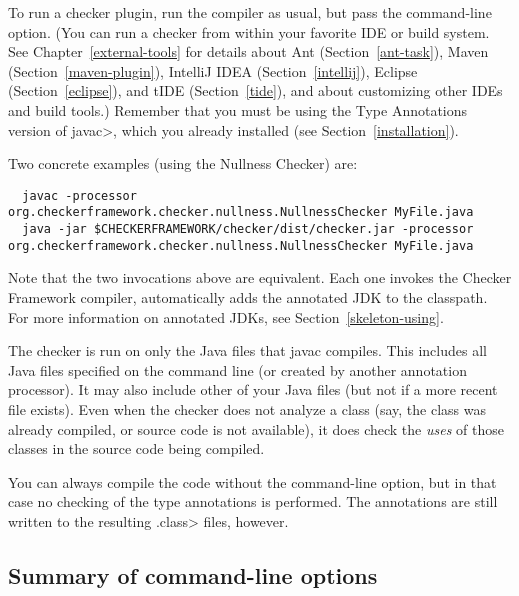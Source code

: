 To run a checker plugin, run the compiler  as usual,
but pass the  command-line
option.
(You can run a checker from within your favorite IDE or build system.  See
Chapter~\ref{external-tools} for details about
Ant (Section~\ref{ant-task}),
Maven (Section~\ref{maven-plugin}),
IntelliJ IDEA (Section~\ref{intellij}),
Eclipse (Section~\ref{eclipse}),
and
tIDE (Section~\ref{tide}), and about customizing other IDEs and build tools.)
Remember that you must be using the
Type Annotations version of \<javac>, which you already installed (see Section~\ref{installation}).

Two concrete examples (using the Nullness Checker) are:

\begin{smaller}
\begin{Verbatim}
  javac -processor org.checkerframework.checker.nullness.NullnessChecker MyFile.java
  java -jar $CHECKERFRAMEWORK/checker/dist/checker.jar -processor org.checkerframework.checker.nullness.NullnessChecker MyFile.java
\end{Verbatim}
\end{smaller}

\noindent
Note that the two invocations above are equivalent.  Each one invokes the
Checker Framework compiler, automatically adds 
the annotated JDK to the classpath.  For more information on annotated
JDKs, see Section~\ref{skeleton-using}.

The checker is run on only the Java files that javac compiles.
This includes all Java files specified on the command line (or
created by another annotation processor).  It may also include other of
your Java files (but not if a more recent  file exists).
Even when the checker does not analyze a class (say, the class was
already compiled, or source code is not available), it does check
the \emph{uses} of those classes in the source code being compiled.

You can always compile the code without the 
command-line option, but in that case no checking of the type
annotations is performed.  The annotations are still written to the
resulting \<.class> files, however.



\subsection{Summary of command-line options\label{checker-options}}

